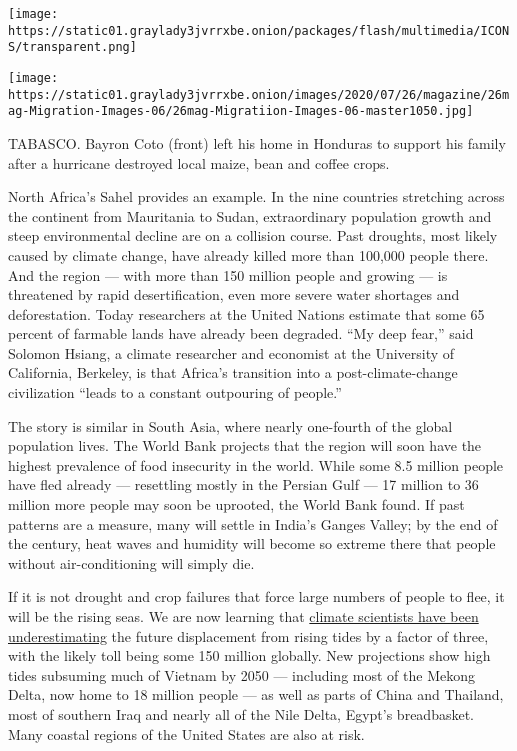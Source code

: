 \texttt{[image: https://static01.graylady3jvrrxbe.onion/packages/flash/multimedia/ICONS/transparent.png]}

\texttt{[image: https://static01.graylady3jvrrxbe.onion/images/2020/07/26/magazine/26mag-Migration-Images-06/26mag-Migratiion-Images-06-master1050.jpg]}

TABASCO. Bayron Coto (front) left his home in Honduras to support his
family after a hurricane destroyed local maize, bean and coffee crops.

North Africa's Sahel provides an example. In the nine countries
stretching across the continent from Mauritania to Sudan, extraordinary
population growth and steep environmental decline are on a collision
course. Past droughts, most likely caused by climate change, have
already killed more than 100,000 people there. And the region --- with
more than 150 million people and growing --- is threatened by rapid
desertification, even more severe water shortages and deforestation.
Today researchers at the United Nations estimate that some 65 percent of
farmable lands have already been degraded. ``My deep fear,'' said
Solomon Hsiang, a climate researcher and economist at the University of
California, Berkeley, is that Africa's transition into a
post-climate-change civilization ``leads to a constant outpouring of
people.''

The story is similar in South Asia, where nearly one-fourth of the
global population lives. The World Bank projects that the region will
soon have the highest prevalence of food insecurity in the world. While
some 8.5 million people have fled already --- resettling mostly in the
Persian Gulf --- 17 million to 36 million more people may soon be
uprooted, the World Bank found. If past patterns are a measure, many
will settle in India's Ganges Valley; by the end of the century, heat
waves and humidity will become so extreme there that people without
air-conditioning will simply die.

If it is not drought and crop failures that force large numbers of
people to flee, it will be the rising seas. We are now learning that
\href{https://www.nature.com/articles/s41467-019-12808-z}{climate
scientists have been underestimating} the future displacement from
rising tides by a factor of three, with the likely toll being some 150
million globally. New projections show high tides subsuming much of
Vietnam by 2050 --- including most of the Mekong Delta, now home to 18
million people --- as well as parts of China and Thailand, most of
southern Iraq and nearly all of the Nile Delta, Egypt's breadbasket.
Many coastal regions of the United States are also at risk.

